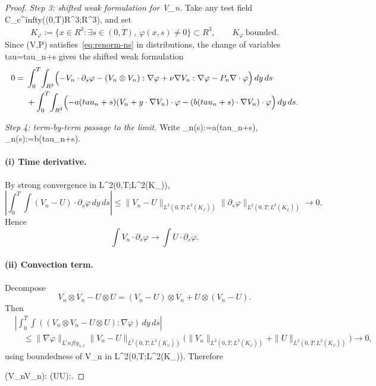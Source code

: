 \documentclass[11pt]{amsart}
\def\({}%
\def\){}%
\def\mathbb#1{#1}%
\def\tau{tau}%
\def\infty{infty}%
\theoremstyle{plain}
\theoremstyle{definition}
\theoremstyle{remark}
\begin{document}
\begin{proof}
\emph{Step 3: shifted weak formulation for \(V_n\).}
Take any test field
\(\varphi\in C_c^\infty((0,T)\times\mathbb R^3;\mathbb R^3)\), and set
\[
K_\varphi:=\overline{\{x\in\mathbb R^3:\exists s\in(0,T),\ \varphi(x,s)\neq0\}}
\subset\mathbb R^3,\qquad K_\varphi\ \text{bounded}.
\]
Since \((V,P)\) satisfies~\eqref{eq:renorm-ns} in distributions, the change of variables
\(\tau=\tau_n+s\) gives the shifted weak formulation
\begin{equation}\label{eq:weak-n}
\begin{aligned}
0={}&\int_0^T\!\int_{\mathbb R^3}
\Bigl(
-V_n\cdot\partial_s\varphi
-(V_n\otimes V_n):\nabla\varphi
+\nu\nabla V_n:\nabla\varphi
-P_n\nabla\cdot\varphi
\Bigr)\,dy\,ds\\
&+\int_0^T\!\int_{\mathbb R^3}
\Bigl(
-a(\tau_n+s)(V_n+y\cdot\nabla V_n)\cdot\varphi
-(b(\tau_n+s)\cdot\nabla V_n)\cdot\varphi
\Bigr)\,dy\,ds.
\end{aligned}
\end{equation}

\emph{Step 4: term-by-term passage to the limit.}
Write \(\alpha_n(s):=a(\tau_n+s)\), \(\beta_n(s):=b(\tau_n+s)\).

\paragraph{(i) Time derivative.}

By strong convergence in \(L^2(0,T;L^2(K_\varphi))\),
\[
  \left|\int_0^T\!\int (V_n-U)\cdot\partial_s\varphi
  \,dy\,ds\right|
  \le
  \|V_n-U\|_{L^2(0,T;L^2(K_\varphi))}
  \|\partial_s\varphi\|_{L^2(0,T;L^2(K_\varphi))}
  \to0.
\]
Hence
\[\int V_n\cdot\partial_s\varphi\to\int U\cdot\partial_s\varphi.
\]

\paragraph{(ii) Convection term.}
Decompose
\[
  V_n\otimes V_n-U\otimes U=(V_n-U)\otimes V_n+U\otimes(V_n-U).
\]
Then
\[
\begin{aligned}
&\left|\int_0^T\!\int((V_n\otimes V_n-U\otimes U):\nabla\varphi)
  \,dy\,ds\right|\\
&\quad\le
  \|\nabla\varphi\|_{L^\infty_{x,t}}
  \|V_n-U\|_{L^2(0,T;L^2(K_\varphi))}
  \bigl(\|V_n\|_{L^2(0,T;L^2(K_\varphi))}
  +\|U\|_{L^2(0,T;L^2(K_\varphi))}\bigr)
  \to0,
\end{aligned}
\]
using boundedness of \(V_n\) in \(L^2(0,T;L^2(K_\varphi))\). Therefore
\(
  \int(V_n\otimes V_n):\nabla\varphi
  \to\int(U\otimes U):\nabla\varphi.
\)


\end{proof}
\end{document}
